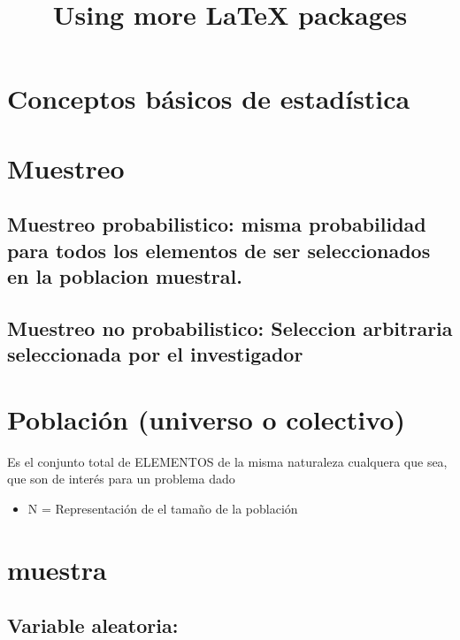 \documentclass[twocolumn]{article}
\title{Using more LaTeX packages}
\author{}
\date{\vspace{-2.5em}}
\providecommand{\tightlist}{%
  \setlength{\itemsep}{0pt}\setlength{\parskip}{0pt}}
\begin{document}
\maketitle

\section{Conceptos básicos de
estadística}\label{conceptos-buxe1sicos-de-estaduxedstica}

\section{Muestreo}\label{muestreo}

\subsection{Muestreo probabilistico: misma probabilidad para todos los
elementos de ser seleccionados en la poblacion
muestral.}\label{muestreo-probabilistico-misma-probabilidad-para-todos-los-elementos-de-ser-seleccionados-en-la-poblacion-muestral.}

\subsection{Muestreo no probabilistico: Seleccion arbitraria
seleccionada por el
investigador}\label{muestreo-no-probabilistico-seleccion-arbitraria-seleccionada-por-el-investigador}

\section{Población (universo o
colectivo)}\label{poblaciuxf3n-universo-o-colectivo}

Es el conjunto total de ELEMENTOS de la misma naturaleza cualquera que
sea, que son de interés para un problema dado

\begin{itemize}
\tightlist
\item
  N = Representación de el tamaño de la población
\end{itemize}

\section{muestra}\label{muestra}

\subsection{Variable aleatoria:}\label{variable-aleatoria}
\end{document}
